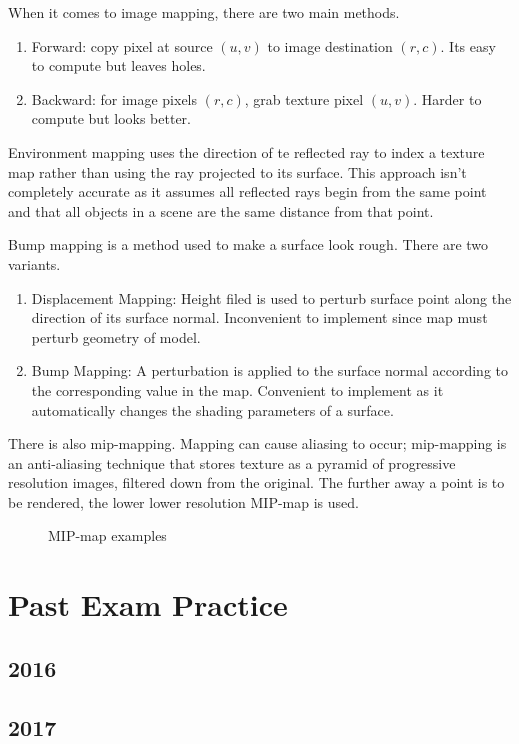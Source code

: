 When it comes to image mapping, there are two main methods.
\begin{enumerate}
	\item Forward: copy pixel at source $(u,v)$ to image destination $(r, c)$. Its easy to compute but leaves holes.
	\item Backward: for image pixels $(r,c)$, grab texture pixel $(u,v)$. Harder to compute but looks better.
\end{enumerate}
Environment mapping uses the direction of te reflected ray to index a texture map rather than using the ray projected to its surface. This approach isn't completely accurate as it assumes all reflected rays begin from the same point and that all objects in a scene are the same distance from that point.

Bump mapping is a method used to make a surface look rough. There are two variants.
\begin{enumerate}
	\item Displacement Mapping: Height filed is used to perturb surface point along the direction of its surface normal. Inconvenient to implement since map must perturb geometry of model.
	\item Bump Mapping: A perturbation is applied to the surface normal according to the corresponding value in the map. Convenient to implement as it automatically changes the shading parameters of a surface.
\end{enumerate}

There is also mip-mapping. Mapping can cause aliasing to occur; mip-mapping is an anti-aliasing technique that stores texture as a pyramid of progressive resolution images, filtered down from the original. The further away a point is to be rendered, the lower lower resolution MIP-map is used.
\begin{figure}[!htb]
	\caption{\label{fig:imageMap} MIP-map examples}
\end{figure}
\newpage
\section{Past Exam Practice}
\subsection{2016}
\subsection{2017}